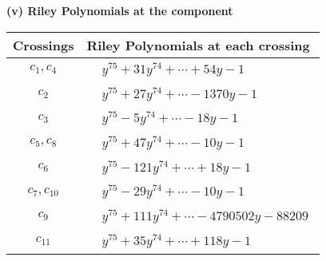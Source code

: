 \documentclass[1p]{elsarticle_modified}
\theoremstyle{definition}
\begin{document}
\newpage\renewcommand{\arraystretch}{1}
\flushleft \textbf{(v) Riley Polynomials at the component}\newline \\
\begin{tabular}{m{50pt}|m{274pt}}
Crossings & \hspace{64pt}Riley Polynomials at each crossing \\
\hline $$\begin{aligned}c_{1},c_{4}\end{aligned}$$&$\begin{aligned}
&y^{75}+31 y^{74}+\cdots+54 y-1
\end{aligned}$\\
\hline $$\begin{aligned}c_{2}\end{aligned}$$&$\begin{aligned}
&y^{75}+27 y^{74}+\cdots-1370 y-1
\end{aligned}$\\
\hline $$\begin{aligned}c_{3}\end{aligned}$$&$\begin{aligned}
&y^{75}-5 y^{74}+\cdots-18 y-1
\end{aligned}$\\
\hline $$\begin{aligned}c_{5},c_{8}\end{aligned}$$&$\begin{aligned}
&y^{75}+47 y^{74}+\cdots-10 y-1
\end{aligned}$\\
\hline $$\begin{aligned}c_{6}\end{aligned}$$&$\begin{aligned}
&y^{75}-121 y^{74}+\cdots+18 y-1
\end{aligned}$\\
\hline $$\begin{aligned}c_{7},c_{10}\end{aligned}$$&$\begin{aligned}
&y^{75}-29 y^{74}+\cdots-10 y-1
\end{aligned}$\\
\hline $$\begin{aligned}c_{9}\end{aligned}$$&$\begin{aligned}
&y^{75}+111 y^{74}+\cdots-4790502 y-88209
\end{aligned}$\\
\hline $$\begin{aligned}c_{11}\end{aligned}$$&$\begin{aligned}
&y^{75}+35 y^{74}+\cdots+118 y-1
\end{aligned}$\\
\hline
\end{tabular}\\~\\
\end{document}
